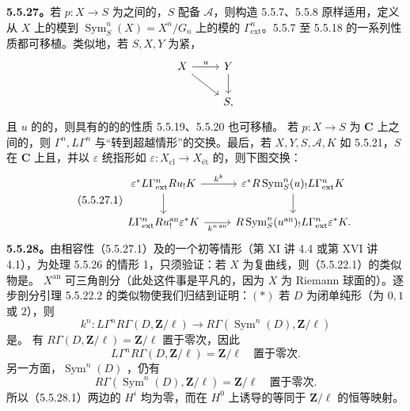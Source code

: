 \textbf{5.5.27。}若 $p:X\to S$ 为之间的，$S$ 配备 $\mathscr A$，则构造 5.5.7、5.5.8 原样适用，定义从 $X$ 上的模到 $\operatorname{Sym}^n_S(X)=X^n/G_n$ 上的模的 $\Gamma^n_{\mathrm{ext}}$。5.5.7 至 5.5.18 的一系列性质都可移植。类似地，若 $S,X,Y$ 为紧，
\[\begin{tikzcd}X\arrow[r,"u"]\arrow[dr]&Y\arrow[d]\\&S,\end{tikzcd}\]
且 $u$ 的的，则具有的的的性质 5.5.19、5.5.20 也可移植。
若 $p:X\to S$ 为 $\mathbf C$ 上之间的，则 $\Gamma^n,L\Gamma^n$ 与“转到超越情形”的交换。最后，若 $X,Y,S,\mathscr A,K$ 如 5.5.21，$S$ 在 $\mathbf C$ 上且，并以 $\varepsilon$ 统指形如 $\varepsilon:X_{\mathrm{cl}}\to X_{\text{ét}}$ 的，则下图交换：
\begin{equation}\tag{5.5.27.1}\begin{tikzcd}
\varepsilon^*L\Gamma^n_{\mathrm{ext}}Ru_!K\arrow[r,"k^k"]\arrow[d]&\varepsilon^*R\operatorname{Sym}^n_S(u)_!L\Gamma^n_{\mathrm{ext}}K\arrow[d]\\
L\Gamma^n_{\mathrm{ext}}Ru^{\mathrm{an}}_!\varepsilon^*K\arrow[r,"{k^{n\,\mathrm{an}}}"']&R\operatorname{Sym}^n_S(u^{\mathrm{an}})_!L\Gamma^n_{\mathrm{ext}}\varepsilon^*K.
\end{tikzcd}\end{equation}
\textbf{5.5.28。}由相容性（5.5.27.1）及的一个初等情形（第 XI 讲 4.4 或第 XVI 讲 4.1），为处理 5.5.26 的情形 1，只须验证：若 $X$ 为复曲线，则（5.5.22.1）的类似物是。
 $X^{\mathrm{an}}$ 可三角剖分（此处这件事是平凡的，因为 $X$ 为 Riemann 球面的）。逐步剖分引理 5.5.22.2 的类似物使我们归结到证明：$(*)$ 若 $D$ 为闭单纯形（为 $0,1$ 或 $2$），则
\begin{equation}\tag{5.5.28.1}k^n:L\Gamma^nR\Gamma(D,\mathbf Z/\ell)\longrightarrow R\Gamma(\operatorname{Sym}^n(D),\mathbf Z/\ell)\end{equation}
是。
有 $R\Gamma(D,\mathbf Z/\ell)=\mathbf Z/\ell$ 置于零次，因此
\[L\Gamma^nR\Gamma(D,\mathbf Z/\ell)=\mathbf Z/\ell\quad\text{置于零次}.\]
另一方面，$\operatorname{Sym}^n(D)$ ，仍有
\[R\Gamma(\operatorname{Sym}^n(D),\mathbf Z/\ell)=\mathbf Z/\ell\quad\text{置于零次}.\]
所以（5.5.28.1）两边的 $H^i$ 均为零，而在 $H^0$ 上诱导的等同于 $\mathbf Z/\ell$ 的恒等映射。

